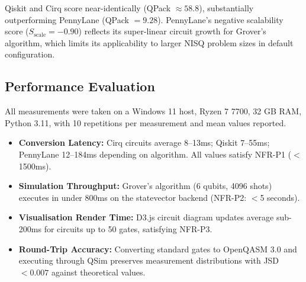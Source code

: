 Qiskit and Cirq score near-identically (QPack $\approx 58.8$), substantially outperforming PennyLane (QPack $= 9.28$). PennyLane's negative scalability score ($S_\text{scale} = -0.90$) reflects its super-linear circuit growth for Grover's algorithm, which limits its applicability to larger NISQ problem sizes in default configuration.

\subsection{Performance Evaluation}

All measurements were taken on a Windows 11 host, Ryzen 7 7700, 32 GB RAM, Python 3.11, with 10 repetitions per measurement and mean values reported.

\begin{itemize}
    \item \textbf{Conversion Latency:} Cirq circuits average 8--13ms; Qiskit 7--55ms; PennyLane 12--184ms depending on algorithm. All values satisfy NFR-P1 ($<$1500ms).
    \item \textbf{Simulation Throughput:} Grover's algorithm (6 qubits, 4096 shots) executes in under 800ms on the statevector backend (NFR-P2: $<$5 seconds).
    \item \textbf{Visualisation Render Time:} D3.js circuit diagram updates average sub-200ms for circuits up to 50 gates, satisfying NFR-P3.
    \item \textbf{Round-Trip Accuracy:} Converting standard gates to OpenQASM 3.0 and executing through QSim preserves measurement distributions with JSD $< 0.007$ against theoretical values.
\end{itemize}
